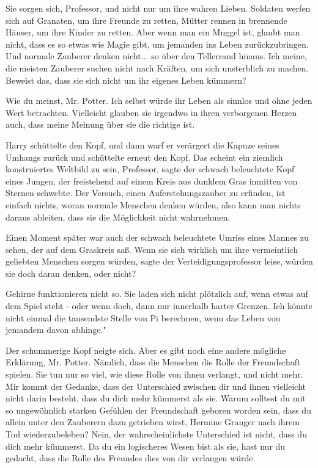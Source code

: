 \glqq{}Sie sorgen sich, Professor, und nicht nur um ihre wahren Lieben. Soldaten
werfen sich auf Granaten, um ihre Freunde zu retten, Mütter rennen in brennende
Häuser, um ihre Kinder zu retten. Aber wenn man ein Muggel ist, glaubt man
nicht, dass es so etwas wie Magie gibt, um jemanden ins Leben zurückzubringen.
Und normale Zauberer denken nicht... so über den Tellerrand hinaus. Ich meine,
die meisten Zauberer suchen nicht nach Kräften, um sich unsterblich zu machen.
Beweist das, dass sie sich nicht um ihr eigenes Leben kümmern?\grqq{}

\glqq{}Wie du meinst, Mr. Potter. Ich selbst würde ihr Leben als sinnlos und ohne
jeden Wert betrachten. Vielleicht glauben sie irgendwo in ihren verborgenen
Herzen auch, dass meine Meinung über sie die richtige ist.\grqq{}

Harry schüttelte den Kopf, und dann warf er verärgert die Kapuze seines Umhangs
zurück und schüttelte erneut den Kopf. \glqq{}Das scheint ein ziemlich
konstruiertes Weltbild zu sein, Professor\grqq{}, sagte der schwach beleuchtete
Kopf eines Jungen, der freistehend auf einem Kreis aus dunklem Gras inmitten von
Sternen schwebte. \glqq{}Der Versuch, einen Auferstehungszauber zu erfinden, ist
einfach nichts, woran normale Menschen denken würden, also kann man nichts
daraus ableiten, dass sie die Möglichkeit nicht wahrnehmen.\grqq{}

Einen Moment später war auch der schwach beleuchtete Umriss eines Mannes zu
sehen, der auf dem Graskreis saß. \glqq{}Wenn sie sich wirklich um ihre
vermeintlich geliebten Menschen sorgen würden\grqq{}, sagte der
Verteidigungsprofessor leise, \glqq{}würden sie doch daran denken, oder
nicht?\grqq{}

\glqq{}Gehirne funktionieren nicht so. Sie laden sich nicht plötzlich auf, wenn
etwas auf dem Spiel steht - oder wenn doch, dann nur innerhalb harter Grenzen.
Ich könnte nicht einmal die tausendste Stelle von Pi berechnen, wenn das Leben
von jemandem davon abhinge."

Der schummerige Kopf neigte sich. \glqq{}Aber es gibt noch eine andere mögliche
Erklärung, Mr. Potter. Nämlich, dass die Menschen die Rolle der Freundschaft
spielen. Sie tun nur so viel, wie diese Rolle von ihnen verlangt, und nicht
mehr. Mir kommt der Gedanke, dass der Unterschied zwischen dir und ihnen
vielleicht nicht darin besteht, dass du dich mehr kümmerst als sie. Warum
solltest du mit so ungewöhnlich starken Gefühlen der Freundschaft geboren worden
sein, dass du allein unter den Zauberern dazu getrieben wirst, Hermine Granger
nach ihrem Tod wiederzubeleben? Nein, der wahrscheinlichste Unterschied ist
nicht, dass du dich mehr kümmerst. Da du ein logischeres Wesen bist als sie,
hast nur du gedacht, dass die Rolle des Freundes dies von dir verlangen
würde.\grqq{}

